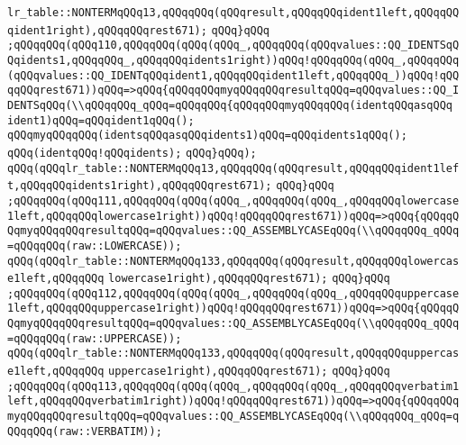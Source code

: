 \verb|lr_table::NONTERMqQQq13,qQQqqQQq(qQQqresult,qQQqqQQqident1left,qQQqqQQqident1right),qQQqqQQqrest671);|\newline
\verb|qQQq}qQQq|\newline
\verb|;qQQqqQQq(qQQq110,qQQqqQQq(qQQq(qQQq_,qQQqqQQq(qQQqvalues::QQ_IDENTSqQQqidents1,qQQqqQQq_,qQQqqQQqidents1right))qQQq!qQQqqQQq(qQQq_,qQQqqQQq(qQQqvalues::QQ_IDENTqQQqident1,qQQqqQQqident1left,qQQqqQQq_))qQQq!qQQqqQQqrest671))qQQq=>qQQq{qQQqqQQqmyqQQqqQQqresultqQQq=qQQqvalues::QQ_IDENTSqQQq(\\qQQqqQQq_qQQq=qQQqqQQq{qQQqqQQqmyqQQqqQQq(identqQQqasqQQq|\newline
\verb|ident1)qQQq=qQQqident1qQQq();|\newline
\verb|qQQqmyqQQqqQQq(identsqQQqasqQQqidents1)qQQq=qQQqidents1qQQq();|\newline
\verb|qQQq(identqQQq!qQQqidents);|\newline
\verb|qQQq}qQQq);|\newline
\verb|qQQq(qQQqlr_table::NONTERMqQQq13,qQQqqQQq(qQQqresult,qQQqqQQqident1left,qQQqqQQqidents1right),qQQqqQQqrest671);|\newline
\verb|qQQq}qQQq|\newline
\verb|;qQQqqQQq(qQQq111,qQQqqQQq(qQQq(qQQq_,qQQqqQQq(qQQq_,qQQqqQQqlowercase1left,qQQqqQQqlowercase1right))qQQq!qQQqqQQqrest671))qQQq=>qQQq{qQQqqQQqmyqQQqqQQqresultqQQq=qQQqvalues::QQ_ASSEMBLYCASEqQQq(\\qQQqqQQq_qQQq=qQQqqQQq(raw::LOWERCASE));|\newline
\verb|qQQq(qQQqlr_table::NONTERMqQQq133,qQQqqQQq(qQQqresult,qQQqqQQqlowercase1left,qQQqqQQq|\newline
\verb|lowercase1right),qQQqqQQqrest671);|\newline
\verb|qQQq}qQQq|\newline
\verb|;qQQqqQQq(qQQq112,qQQqqQQq(qQQq(qQQq_,qQQqqQQq(qQQq_,qQQqqQQquppercase1left,qQQqqQQquppercase1right))qQQq!qQQqqQQqrest671))qQQq=>qQQq{qQQqqQQqmyqQQqqQQqresultqQQq=qQQqvalues::QQ_ASSEMBLYCASEqQQq(\\qQQqqQQq_qQQq=qQQqqQQq(raw::UPPERCASE));|\newline
\verb|qQQq(qQQqlr_table::NONTERMqQQq133,qQQqqQQq(qQQqresult,qQQqqQQquppercase1left,qQQqqQQq|\newline
\verb|uppercase1right),qQQqqQQqrest671);|\newline
\verb|qQQq}qQQq|\newline
\verb|;qQQqqQQq(qQQq113,qQQqqQQq(qQQq(qQQq_,qQQqqQQq(qQQq_,qQQqqQQqverbatim1left,qQQqqQQqverbatim1right))qQQq!qQQqqQQqrest671))qQQq=>qQQq{qQQqqQQqmyqQQqqQQqresultqQQq=qQQqvalues::QQ_ASSEMBLYCASEqQQq(\\qQQqqQQq_qQQq=qQQqqQQq(raw::VERBATIM));|\newline
